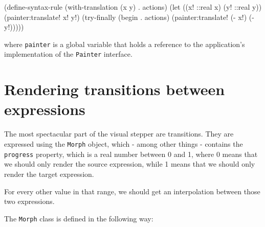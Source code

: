 \documentclass[acmsmall]{acmart}
\newenvironment{Snippet}{\Verbatim[samepage=true]}{\endVerbatim}
\begin{document}
\begin{Snippet}
(define-syntax-rule (with-translation (x y)
		      . actions)
  (let ((x! ::real x)
        (y! ::real y))
    (painter:translate! x! y!)
    (try-finally
     (begin . actions)
     (painter:translate! (- x!) (- y!)))))
\end{Snippet}

where \texttt{painter} is a global variable that holds a reference
to the application's implementation of the \texttt{Painter} interface.


\section{Rendering transitions between expressions}
\label{sec:orgd8f76bf}

The most spectacular part of the visual stepper are transitions. They
are expressed using the \texttt{Morph} object, which - among other things -
contains the \texttt{progress} property, which is a real number between 0 and
1, where 0 means that we should only render the source expression,
while 1 means that we should only render the target expression.

For every other value in that range, we should get an interpolation
between those two expressions.

The \texttt{Morph} class is defined in the following way:
\end{document}
